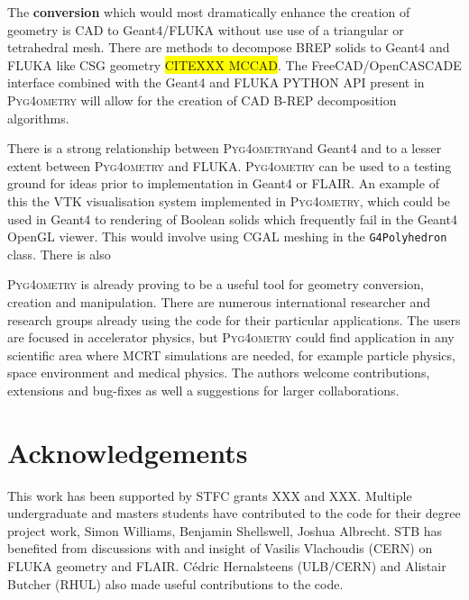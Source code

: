 \documentclass[final,5p,times,twocolumn]{elsarticle}
\newcommand{\pyinline}[1]{\lstinline[postbreak={}]{#1}}
\newcommand{\PYGEOMETRY}{\textsc{Pyg4ometry}}
\begin{document}
The {\bf conversion} which would most dramatically enhance the creation of geometry is CAD to Geant4/FLUKA
without use use of a triangular or tetrahedral mesh. There are methods to decompose BREP solids to Geant4 and 
FLUKA like CSG geometry \colorbox{yellow}{CITEXXX MCCAD}. The FreeCAD/OpenCASCADE interface
combined with the Geant4 and FLUKA PYTHON API present in \PYGEOMETRY{} will allow for the creation 
of CAD B-REP decomposition algorithms.

There is a strong relationship between \PYGEOMETRY and Geant4 and to a lesser extent between 
\PYGEOMETRY{} and FLUKA. \PYGEOMETRY{} can be used to a testing ground for ideas prior to 
implementation in Geant4 or FLAIR. An example of this the VTK visualisation system implemented in 
\PYGEOMETRY{}, which could be used in Geant4 to rendering of Boolean solids which frequently 
fail in the Geant4 OpenGL viewer. This would involve using CGAL meshing in the \pyinline{G4Polyhedron}
class. There is also

\PYGEOMETRY{} is already proving to be a useful tool for geometry conversion, creation and manipulation.
There are numerous international researcher and research groups already using the code for their particular applications.
The users are focused in accelerator physics, but \PYGEOMETRY{} could find application in any scientific
area where MCRT simulations are needed, for example particle physics, space environment and medical physics.
The authors welcome contributions, extensions and bug-fixes as well a suggestions for larger collaborations.

\section{Acknowledgements}
This work has been supported by STFC grants XXX and XXX. Multiple undergraduate and masters students 
have contributed to the code for their degree project work, Simon Williams, Benjamin Shellswell, Joshua Albrecht. 
STB has benefited from discussions with and insight of Vasilis Vlachoudis (CERN) on FLUKA geometry and FLAIR. 
Cédric Hernalsteens (ULB/CERN) and Alistair Butcher (RHUL) also made useful contributions to the code.


\end{document}

